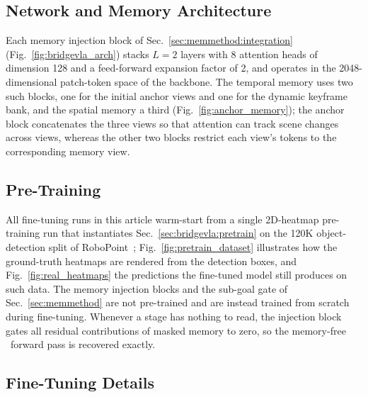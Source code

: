 \subsection{Network and Memory Architecture}
\label{app:arch_details}

Each memory injection block of Sec.~\ref{sec:memmethod:integration}
(Fig.~\ref{fig:bridgevla_arch}) stacks $L{=}2$ layers with 8 attention heads of dimension 128 and a
feed-forward expansion factor of 2, and operates in the
2048-dimensional patch-token space of the backbone.
The temporal memory uses two such blocks, one for the initial anchor
views and one for the dynamic keyframe bank, and the spatial memory a
third (Fig.~\ref{fig:anchor_memory}); the anchor block concatenates the three views so that attention
can track scene changes across views, whereas the other two blocks
restrict each view's tokens to the corresponding memory view.

\subsection{Pre-Training}
\label{app:pretrain_details}

All fine-tuning runs in this article warm-start from a single
2D-heatmap pre-training run that instantiates
Sec.~\ref{sec:bridgevla:pretrain} on the 120K object-detection split
of RoboPoint~\cite{yuan2024robopoint}; Fig.~\ref{fig:pretrain_dataset}
illustrates how the ground-truth heatmaps are rendered from the
detection boxes, and Fig.~\ref{fig:real_heatmaps} the predictions the
fine-tuned model still produces on such data.
The memory injection blocks and the sub-goal gate of
Sec.~\ref{sec:memmethod} are not pre-trained and are instead trained
from scratch during fine-tuning.
Whenever a stage has nothing to read, the injection block gates all
residual contributions of masked memory to zero, so the memory-free
\method\ forward pass is recovered exactly.

\subsection{Fine-Tuning Details}
\label{app:finetune_hparams}

